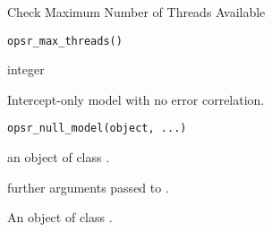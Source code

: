 
%
\begin{Description}
Check Maximum Number of Threads Available
\end{Description}
%
\begin{Usage}
\begin{verbatim}
opsr_max_threads()
\end{verbatim}
\end{Usage}
%
\begin{Value}
integer
\end{Value}
%
\begin{SeeAlso}
\end{SeeAlso}


%
\begin{Description}
Intercept-only model with no error correlation.
\end{Description}
%
\begin{Usage}
\begin{verbatim}
opsr_null_model(object, ...)
\end{verbatim}
\end{Usage}
%
\begin{Arguments}
\begin{ldescription}
\item[\code{object}] an object of class .

\item[\code{...}] further arguments passed to .
\end{ldescription}
\end{Arguments}
%
\begin{Value}
An object of class .
\end{Value}
%
\begin{Examples}
\end{Examples}


